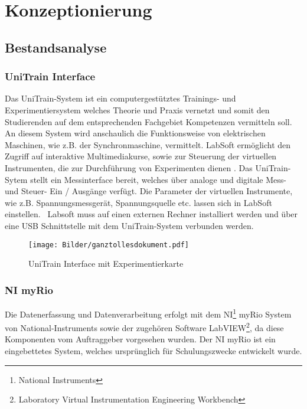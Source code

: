 \chapter{Konzeptionierung}

\section{Bestandsanalyse}

\subsection{UniTrain Interface}

Das UniTrain-System ist ein computergestütztes Trainings- und Experimentiersystem welches Theorie und Praxis vernetzt und somit den Studierenden auf dem entsprechenden Fachgebiet Kompetenzen vermitteln soll. An diesem System wird anschaulich die Funktionsweise von elektrischen Maschinen, wie z.B. der Synchronmaschine, vermittelt.\newline 
LabSoft ermöglicht den Zugriff auf interaktive Multimediakurse, sowie zur Steuerung der virtuellen Instrumenten, die zur Durchführung von Experimenten dienen \cite{labsoft, unitrain}. Das UniTrain-Sytem stellt ein Messinterface bereit, welches über analoge und digitale Mess- und Steuer- Ein / Ausgänge verfügt. Die Parameter der virtuellen Instrumente, wie z.B. Spannungsmessgerät, Spannungsquelle etc. lassen sich in LabSoft einstellen.\newline
 Labsoft muss auf einen externen Rechner installiert werden und über eine USB Schnittstelle mit dem UniTrain-System verbunden werden. 

\begin{figure}[H]
	\centering
	\texttt{[image: Bilder/ganztollesdokument.pdf]} %
	\caption{UniTrain Interface mit Experimentierkarte}
	\label{fig: UniTrain Interface mit Experimentierkarter}
\end{figure}

\subsection{NI myRio}


Die Datenerfassung und Datenverarbeitung erfolgt mit dem NI\footnote{National Instruments} myRio System von National-Instruments sowie der zugehören Software LabVIEW\footnote{Laboratory Virtual Instrumentation Engineering Workbench}, da diese Komponenten vom Auftraggeber vorgesehen wurden. Der NI myRio ist ein eingebettetes System, welches ursprünglich für Schulungszwecke entwickelt wurde.\cite{myrio}

